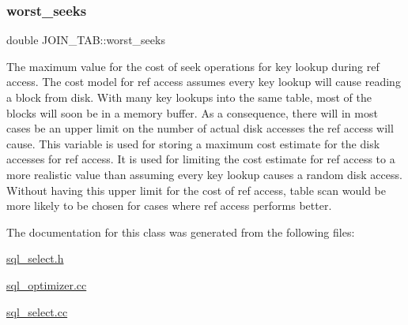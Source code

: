 \subsubsection{\texorpdfstring{worst\+\_\+seeks}{worst\_seeks}}
{\footnotesize\ttfamily double J\+O\+I\+N\+\_\+\+T\+A\+B\+::worst\+\_\+seeks}

The maximum value for the cost of seek operations for key lookup during ref access. The cost model for ref access assumes every key lookup will cause reading a block from disk. With many key lookups into the same table, most of the blocks will soon be in a memory buffer. As a consequence, there will in most cases be an upper limit on the number of actual disk accesses the ref access will cause. This variable is used for storing a maximum cost estimate for the disk accesses for ref access. It is used for limiting the cost estimate for ref access to a more realistic value than assuming every key lookup causes a random disk access. Without having this upper limit for the cost of ref access, table scan would be more likely to be chosen for cases where ref access performs better. 

The documentation for this class was generated from the following files\+:\begin{DoxyCompactItemize}
\item 
\mbox{\hyperlink{sql__select_8h}{sql\+\_\+select.\+h}}\item 
\mbox{\hyperlink{sql__optimizer_8cc}{sql\+\_\+optimizer.\+cc}}\item 
\mbox{\hyperlink{sql__select_8cc}{sql\+\_\+select.\+cc}}\end{DoxyCompactItemize}
